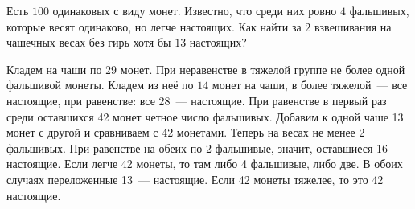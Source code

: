 Есть $100$ одинаковых с виду монет.
Известно, что среди них ровно $4$ фальшивых, которые весят одинаково, но легче
настоящих.
Как найти за $2$ взвешивания на чашечных весах без гирь хотя бы $13$ настоящих?

\solution
Кладем на чаши по $29$ монет.
При неравенстве в тяжелой группе не более одной фальшивой монеты.
Кладем из неё по $14$ монет на чаши, в более тяжелой~--- все настоящие, при
равенстве: все 28~--- настоящие.
При равенстве в первый раз среди оставшихся 42 монет четное число фальшивых.
Добавим к одной чаше 13 монет с другой и сравниваем с 42 монетами.
Теперь на весах не менее 2 фальшивых.
При равенстве на обеих по 2 фальшивые, значит, оставшиеся 16~--- настоящие.
Если легче 42 монеты, то там либо 4 фальшивые, либо две.
В обоих случаях переложенные 13~--- настоящие.
Если 42 монеты тяжелее, то это 42 настоящие.

